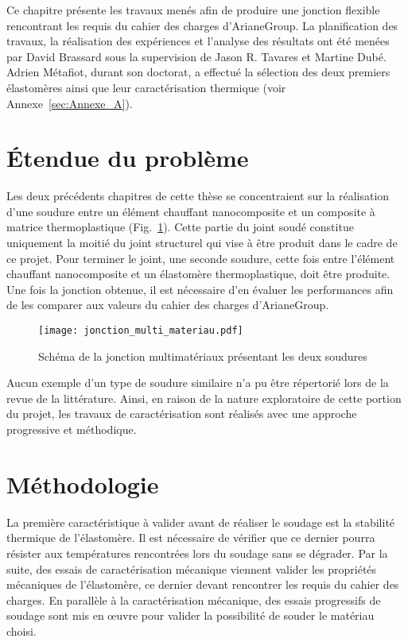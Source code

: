 \label{sec:Theme3}

Ce chapitre présente les travaux menés afin de produire une jonction flexible rencontrant les requis du cahier des charges d'ArianeGroup. 
La planification des travaux, la réalisation des expériences et l'analyse des résultats ont été menées par David Brassard sous la supervision de Jason R. Tavares et Martine Dubé. 
Adrien Métafiot, durant son doctorat, a effectué la sélection des deux premiers élastomères ainsi que leur caractérisation thermique (voir Annexe~\ref{sec:Annexe_A}). 

\section{Étendue du problème}

Les deux précédents chapitres de cette thèse se concentraient sur la réalisation d'une soudure entre un élément chauffant nanocomposite et un composite à matrice thermoplastique \mbox{(Fig.~\ref{fig:scema_double_jonction})}. 
Cette partie du joint soudé constitue uniquement la moitié du joint structurel qui vise à être produit dans le cadre de ce projet. 
Pour terminer le joint, une seconde soudure, cette fois entre l'élément chauffant nanocomposite et un élastomère thermoplastique, doit être produite. 
Une fois la jonction obtenue, il est nécessaire d'en évaluer les performances afin de les comparer aux valeurs du cahier des charges d'ArianeGroup. 

\begin{figure}[h]
	\centering
	\texttt{[image: jonction\_multi\_materiau.pdf]}
	\caption{Schéma de la jonction multimatériaux présentant les deux soudures}
	\label{fig:scema_double_jonction}
\end{figure}

Aucun exemple d'un type de soudure similaire n'a pu être répertorié lors de la revue de la littérature. 
Ainsi, en raison de la nature exploratoire de cette portion du projet, les travaux de caractérisation sont réalisés avec une approche progressive et méthodique. 

\section{Méthodologie}

La première caractéristique à valider avant de réaliser le soudage est la stabilité thermique de l'élastomère. 
Il est nécessaire de vérifier que ce dernier pourra résister aux températures rencontrées lors du soudage sans se dégrader. 
Par la suite, des essais de caractérisation mécanique viennent valider les propriétés mécaniques de l'élastomère, ce dernier devant rencontrer les requis du cahier des charges. 
En parallèle à la caractérisation mécanique, des essais progressifs de soudage sont mis en œuvre pour valider la possibilité de souder le matériau choisi. 

